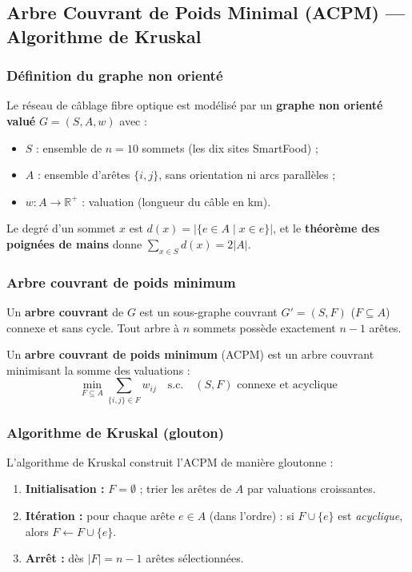 \documentclass[12pt,a4paper]{article}
\begin{document}
\subsection{Arbre Couvrant de Poids Minimal (ACPM) — Algorithme de Kruskal}

\subsubsection{Définition du graphe non orienté}

Le réseau de câblage fibre optique est modélisé par un \textbf{graphe non orienté valué}
$G = (S, A, w)$ avec :
\begin{itemize}[noitemsep]
  \item $S$ : ensemble de $n = 10$ sommets (les dix sites SmartFood) ;
  \item $A$ : ensemble d'arêtes $\{i,j\}$, sans orientation ni arcs parallèles ;
  \item $w : A \to \mathbb{R}^+$ : valuation (longueur du câble en km).
\end{itemize}

Le degré d'un sommet $x$ est $d(x) = |\{e \in A \mid x \in e\}|$, et le
\textbf{théorème des poignées de mains} donne $\sum_{x\in S} d(x) = 2|A|$.

\subsubsection{Arbre couvrant de poids minimum}

Un \textbf{arbre couvrant} de $G$ est un sous-graphe couvrant $G'=(S, F)$
($F \subseteq A$) connexe et sans cycle. Tout arbre à $n$ sommets possède
exactement $n-1$ arêtes.

Un \textbf{arbre couvrant de poids minimum} (ACPM) est un arbre couvrant
minimisant la somme des valuations :
\[
\min_{F \subseteq A} \sum_{\{i,j\}\in F} w_{ij}
\quad\text{s.c.}\quad
(S, F) \text{ connexe et acyclique}
\]

\subsubsection{Algorithme de Kruskal (glouton)}

L'algorithme de Kruskal construit l'ACPM de manière gloutonne :

\begin{enumerate}[noitemsep]
  \item \textbf{Initialisation :} $F = \emptyset$ ; trier les arêtes de $A$ par
        valuations croissantes.
  \item \textbf{Itération :} pour chaque arête $e \in A$ (dans l'ordre) :
        \quad si $F \cup \{e\}$ est \emph{acyclique}, alors $F \leftarrow F \cup \{e\}$.
  \item \textbf{Arrêt :} dès $|F| = n-1$ arêtes sélectionnées.
\end{enumerate}
\end{document}
